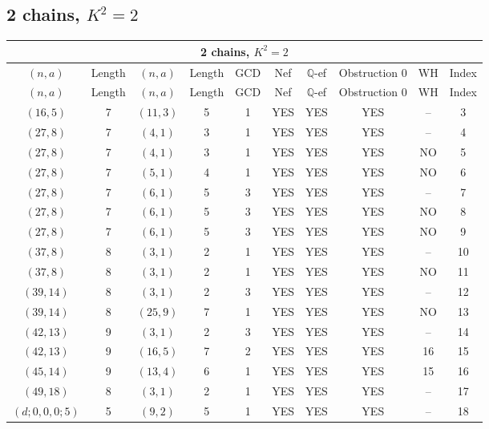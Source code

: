 \subsection{2 chains, $K^2 = 2$}
\begin{longtable}{|c|c|c|c|c|c|c|c|c|c|}
\hline
\multicolumn{10}{|c|}{2 chains, $K^2 = 2$}\\
\hline
$(n,a)$ & Length & $(n,a)$ & Length & GCD & Nef & $\mathbb Q$-ef & Obstruction 0 & WH & Index\\
\hline
\endfirsthead

\hline
$(n,a)$ & Length & $(n,a)$ & Length & GCD & Nef & $\mathbb Q$-ef & Obstruction 0 & WH & Index\\
\hline
\endhead
\hline
\endfoot

$(16, 5)$ & 7 & $(11, 3)$ & 5 & 1 & YES & YES & YES & -- & 3\\
$(27, 8)$ & 7 & $(4, 1)$ & 3 & 1 & YES & YES & YES & -- & 4\\
$(27, 8)$ & 7 & $(4, 1)$ & 3 & 1 & YES & YES & YES & NO & 5\\
$(27, 8)$ & 7 & $(5, 1)$ & 4 & 1 & YES & YES & YES & NO & 6\\
$(27, 8)$ & 7 & $(6, 1)$ & 5 & 3 & YES & YES & YES & -- & 7\\
$(27, 8)$ & 7 & $(6, 1)$ & 5 & 3 & YES & YES & YES & NO & 8\\
$(27, 8)$ & 7 & $(6, 1)$ & 5 & 3 & YES & YES & YES & NO & 9\\
$(37, 8)$ & 8 & $(3, 1)$ & 2 & 1 & YES & YES & YES & -- & 10\\
$(37, 8)$ & 8 & $(3, 1)$ & 2 & 1 & YES & YES & YES & NO & 11\\
$(39, 14)$ & 8 & $(3, 1)$ & 2 & 3 & YES & YES & YES & -- & 12\\
$(39, 14)$ & 8 & $(25, 9)$ & 7 & 1 & YES & YES & YES & NO & 13\\
$(42, 13)$ & 9 & $(3, 1)$ & 2 & 3 & YES & YES & YES & -- & 14\\
$(42, 13)$ & 9 & $(16, 5)$ & 7 & 2 & YES & YES & YES & 16 & 15\\
$(45, 14)$ & 9 & $(13, 4)$ & 6 & 1 & YES & YES & YES & 15 & 16\\
$(49, 18)$ & 8 & $(3, 1)$ & 2 & 1 & YES & YES & YES & -- & 17\\
$(d; 0, 0, 0; 5)$ & 5 & $(9, 2)$ & 5 & 1 & YES & YES & YES & -- & 18
\end{longtable}
